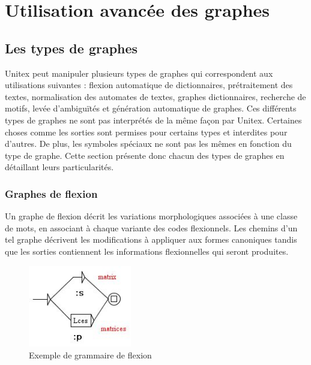 \chapter{Utilisation avancée des graphes}
\label{chap-advanced-grammars}
\section{Les types de graphes}
Unitex peut manipuler plusieurs types de graphes qui correspondent aux utilisations
suivantes : flexion automatique de dictionnaires, prétraitement des textes, normalisation
des automates de textes, graphes dictionnaires, recherche de motifs, levée d’ambiguïtés et
génération automatique de graphes. Ces différents types de graphes ne sont pas interprétés
de la même façon par Unitex. Certaines choses comme les sorties sont permises pour certains
types et interdites pour d’autres. De plus, les symboles spéciaux ne sont pas les mêmes en
fonction du type de graphe. Cette section présente donc chacun des types de graphes en
détaillant leurs particularités.


\subsection{Graphes de flexion}
Un graphe de flexion décrit les variations morphologiques associées à une classe de
mots, en associant à chaque variante des codes flexionnels. Les chemins d’un tel graphe décrivent
les modifications à appliquer aux formes canoniques tandis que les sorties contiennent
les informations flexionnelles qui seront produites.


\bigskip
\begin{figure}[!h]
\begin{center}
\includegraphics[width=4.5cm]{resources/img/fig6-1.png}
\caption{Exemple de grammaire de flexion}
\end{center}
\end{figure}

